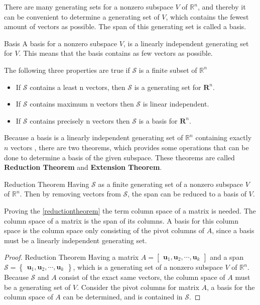 There are many generating sets for a nonzero subspace $V$ of $\mathbb{R}^n$, and thereby it can be convenient to determine a generating set of $V$, which contains the fewest amount of vectors as possible. The span of this generating set is called a basis.

\begin{definition}{Basis}
A basis for a nonzero subspace $V$, is a linearly independent generating set for $V$. This means that the basis contains as few vectors as possible.
\end{definition}

The following three properties are true if $\mathcal{S}$ is a finite subset of $\mathbb{R}^n$
\begin{itemize}
    \item If $\mathcal{S}$ contains a least n vectors, then $\mathcal{S}$ is a generating set for $\mathbf{R}^n$. 
    \item If $\mathcal{S}$ contains maximum n vectors then $\mathcal{S}$ is linear independent.
    \item If $\mathcal{S}$ contains precisely n vectors then $\mathcal{S}$ is a basis for $\mathbf{R}^n$.
\end{itemize}

Because a basis is a linearly independent generating set of $\mathbb{R}^n$ containing exactly $n$ vectors , there are two theorems, which provides some operations that can be done to determine a basis of the given subspace. These theorems are called \textbf{Reduction Theorem} and \textbf{Extension Theorem}.

\begin{theorem}{Reduction Theorem}
Having $\mathcal{S}$ as a finite generating set of a nonzero subspace $V$ of $\mathbb{R}^n$. Then by removing vectors from $\mathcal{S}$, the span can be reduced to a basis of $V$.
\cite[243]{LiAl}
\label{reductiontheorem}
\end{theorem}
Proving the \ref{reductiontheorem} the term column space of a matrix is needed. The column space of a matrix is the span of its columns. A basis for this column space is the column space only consisting of the pivot columns of $A$, since a basis must be a linearly independent generating set.

\begin{proof}{Reduction Theorem}
Having a matrix $A=\begin{bmatrix}
 \textbf{u}_1, \textbf{u}_2, \cdots, \textbf{u}_k
\end{bmatrix}$ and a span
$
\mathcal{S}=\begin{Bmatrix}
 \textbf{u}_1, \textbf{u}_2, \cdots, \textbf{u}_k
\end{Bmatrix}  
$, which is a generating set of a nonzero subspace $V$ of $\mathbb{R}^n$. Because $\mathcal{S}$ and $A$ consist of the exact same vectors, the column space of $A$ must be a generating set of $V$. Consider the pivot columns for matrix $A$, a basis for the column space of $A$ can be determined, and is contained in $\mathcal{S}$. \qedsymbol
\end{proof}



